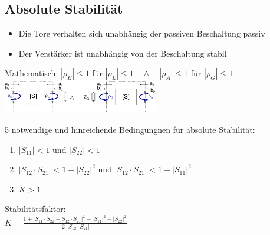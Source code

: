 \documentclass[english]{latex4ei/latex4ei_sheet}
\begin{document}
\begin{sectionbox}
    \subsection{Absolute Stabilität}
    \begin{itemize}
        \item Die Tore verhalten sich unabhängig der passiven Beschaltung passiv
        \item Der Verstärker ist unabhängig von der Beschaltung stabil
    \end{itemize}
    Mathematisch: $\left|\rho_{E}\right|\le1$ für $\left|\rho_{L}\right|\le1 \quad \wedge \quad\left|\rho_{A}\right|\le1$ für $\left|\rho_{G}\right|\le1$\\
    \includegraphics[width = 6.8cm]{./img/stablilitaet.png}\\
    \begin{emphbox}
        5 notwendige und hinreichende Bedingungnen für absolute Stabilität:\\
        \begin{enumerate}
            \item $\left|S_{11}\right|<1$ und $\left|S_{22}\right|<1$
            \item $\left|S_{12} \cdot S_{21}\right|<1-\left|S_{22}\right|^{2}$ und $\left|S_{12} \cdot S_{21}\right|<1-\left|S_{11}\right|^{2}$
            \item $K > 1$
        \end{enumerate}
        Stabilitätsfaktor:\\
        $K=\frac{1+\left|S_{11} \cdot S_{22}-S_{12} \cdot S_{21}\right|^{2}-\left|S_{11}\right|^{2}-\left|S_{22}\right|^{2}}{\left|2 \cdot S_{12} \cdot S_{21}\right|}$
    \end{emphbox}


\end{sectionbox}
\end{document}
